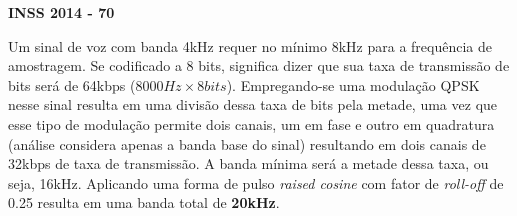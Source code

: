 \textbf{INSS 2014 - 70}

Um sinal de voz com banda 4kHz requer no mínimo 8kHz para a frequência de amostragem. Se codificado a 8 bits, significa dizer que sua taxa de transmissão de bits será de 64kbps ($8000Hz\times8bits$). Empregando-se uma modulação QPSK nesse sinal resulta em uma divisão dessa taxa de bits pela metade, uma vez que esse tipo de modulação permite dois canais, um em fase e outro em quadratura (análise considera apenas a banda base do sinal) resultando em dois canais de 32kbps de taxa de transmissão. A banda mínima será a metade dessa taxa, ou seja, 16kHz. Aplicando uma forma de pulso \textit{raised cosine} com fator de \textit{roll-off} de 0.25 resulta em uma banda total de \textbf{20kHz}.